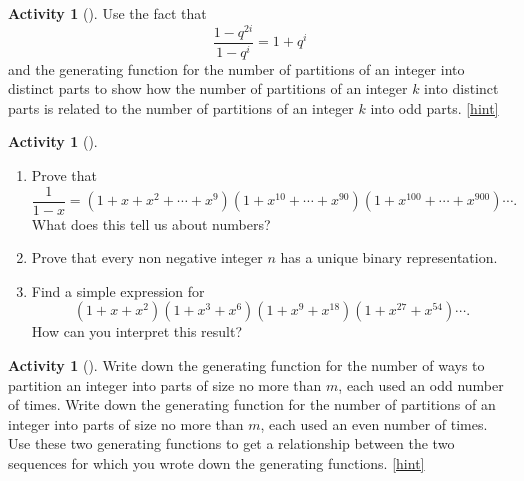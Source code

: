 \documentclass[10pt,]{book}
\theoremstyle{plain}
\theoremstyle{definition}
\theoremstyle{definition}
\theoremstyle{definition}
\newtheorem{activity}[project]{Activity}
\numberwithin{equation}{chapter}
\begin{document}
\begin{activity}[]\label{activity-317}
\hypertarget{p-1604}{}%
Use the fact that%
\begin{equation*}
\frac{1-q^{2i}}{1-q^i}= 1+q^i
\end{equation*}
and the generating function for the number of partitions of an integer into distinct parts to show how the number of partitions of an integer \(k\) into distinct parts is related to the number of partitions of an integer \(k\) into odd parts.%
\hfill{\tiny\hyperlink{a-324}{[hint]}\hypertarget{q-324}{}}\end{activity}
\begin{activity}[]\label{activity-318}
\leavevmode%
\begin{enumerate}[font=\bfseries,label=(\alph*),ref=\alph*]
\item\label{task-276} \hypertarget{p-1607}{}%
Prove that%
\begin{equation*}
\frac{1}{1-x} = (1 + x + x^2 +\cdots + x^9)(1 + x^{10} + \cdots + x^{90})(1 + x^{100} + \cdots + x^{900})\cdots.
\end{equation*}
What does this tell us about numbers?%
\item\label{task-277} \hypertarget{p-1608}{}%
Prove that every non negative integer \(n\) has a unique binary representation.%
\item\label{task-278} \hypertarget{p-1609}{}%
Find a simple expression for%
\begin{equation*}
(1+x+x^2)(1+x^3+x^6)(1+x^9+x^{18})(1+x^{27}+x^{54})\cdots.
\end{equation*}
How can you interpret this result?%
\end{enumerate}
\end{activity}
\begin{activity}[]\label{activity-319}
\hypertarget{p-1610}{}%
Write down the generating function for the number of ways to partition an integer into parts of size no more than \(m\), each used an odd number of times. Write down the generating function for the number of partitions of an integer into parts of size no more than \(m\), each used an even number of times. Use these two generating functions to get a relationship between the two sequences for which you wrote down the generating functions.%
\hfill{\tiny\hyperlink{a-326}{[hint]}\hypertarget{q-326}{}}\end{activity}
\end{document}
